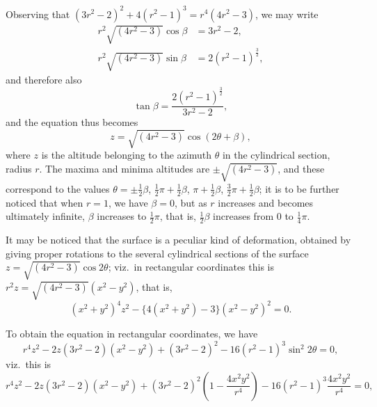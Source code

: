 \documentclass[11pt,a4paper]{article}
\begin{document}
Observing that $(3r^2 - 2)^2 + 4(r^2 - 1)^3 = r^4 (4r^2 - 3)$, we may write
\begin{align*}
r^2 \sqrt{(4r^2 - 3)} \cos\beta &= 3r^2 - 2, \\
r^2 \sqrt{(4r^2 - 3)} \sin\beta &= 2(r^2 - 1)^{\tfrac{3}{2}},
\end{align*}
and therefore also
\[
\tan\beta = \frac{2(r^2 - 1)^{\tfrac{3}{2}}}{3r^2 - 2},
\]
and the equation thus becomes
\[
z = \sqrt{(4r^2 - 3)} \cos(2\theta + \beta),
\]
where $z$ is the altitude belonging to the azimuth $\theta$ in the cylindrical section, radius $r$. The maxima and minima altitudes are $\pm\sqrt{(4r^2 - 3)}$, and these correspond to the values $\theta = \pm\tfrac{1}{2}\beta$, $\tfrac{1}{2}\pi + \tfrac{1}{2}\beta$, $\pi + \tfrac{1}{2}\beta$, $\tfrac{3}{2}\pi + \tfrac{1}{2}\beta$; it is to be further noticed that when $r = 1$, we have $\beta = 0$, but as $r$ increases and becomes ultimately infinite, $\beta$ increases to $\tfrac{1}{2}\pi$, that is, $\tfrac{1}{2}\beta$ increases from $0$ to $\tfrac{1}{4}\pi$.

It may be noticed that the surface is a peculiar kind of deformation, obtained by giving proper rotations to the several cylindrical sections of the surface $z = \sqrt{(4r^2 - 3)} \cos 2\theta$; viz.\ in rectangular coordinates this is $r^2 z = \sqrt{(4r^2 - 3)} (x^2 - y^2)$, that is,
\[
(x^2 + y^2)^4 z^2 - \{4(x^2 + y^2) - 3\}(x^2 - y^2)^2 = 0.
\]

To obtain the equation in rectangular coordinates, we have
\[
r^4 z^2 - 2z(3r^2 - 2)(x^2 - y^2) + (3r^2 - 2)^2 - 16 (r^2 - 1)^3 \sin^2 2\theta = 0,
\]
viz.\ this is
\[
r^4 z^2 - 2z (3r^2 - 2)(x^2 - y^2) + (3r^2 - 2)^2 \left(1 - \frac{4x^2 y^2}{r^4}\right) - 16(r^2 - 1)^3 \frac{4x^2 y^2}{r^4} = 0,
\]

\bigskip
\end{document}
